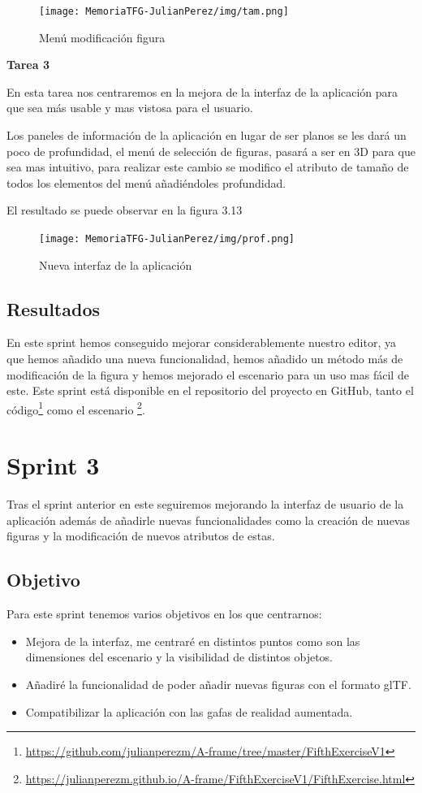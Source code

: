 \documentclass[a4paper, 12pt]{book}
\begin{document}
\begin{figure}[H]
  \centering
  \texttt{[image: MemoriaTFG-JulianPerez/img/tam.png]}
  \caption{Menú modificación figura}\label{scrum}
\end{figure}

\textbf{Tarea 3}

En esta tarea nos centraremos en la mejora de la interfaz de la aplicación para que sea más usable y mas vistosa para el usuario. 

Los paneles de información de la aplicación en lugar de ser planos se les dará un poco de profundidad, el menú de selección de figuras, pasará a ser en 3D para que sea mas intuitivo, para realizar este cambio se modifico el atributo de tamaño de todos los elementos del menú añadiéndoles profundidad.

El resultado se puede observar en la figura 3.13

\begin{figure}[H]
  \centering
  \texttt{[image: MemoriaTFG-JulianPerez/img/prof.png]}
  \caption{Nueva interfaz de la aplicación}\label{scrum}
\end{figure}

\subsection{Resultados}

En este sprint hemos conseguido mejorar considerablemente nuestro editor, ya que hemos añadido una nueva funcionalidad, hemos añadido un método más de modificación de la figura y hemos mejorado el escenario para un uso mas fácil de este. Este sprint está disponible en el repositorio del proyecto en GitHub, tanto el código\footnote{\url{https://github.com/julianperezm/A-frame/tree/master/FifthExerciseV1}} como el escenario \footnote{\url{https://julianperezm.github.io/A-frame/FifthExerciseV1/FifthExercise.html}}.


\section{Sprint 3}

Tras el sprint anterior en este seguiremos mejorando la interfaz de usuario de la aplicación además de añadirle nuevas funcionalidades como la creación de nuevas figuras y la modificación de nuevos atributos de estas.

\subsection{Objetivo}
Para este sprint tenemos varios objetivos en los que centrarnos:
\begin{itemize}
    \item Mejora de la interfaz, me centraré en distintos puntos como son las dimensiones del escenario y la visibilidad de distintos objetos.
    \item Añadiré la funcionalidad de poder añadir nuevas figuras con el formato glTF.
    \item Compatibilizar la aplicación con las gafas de realidad aumentada.
\end{itemize}
\end{document}
